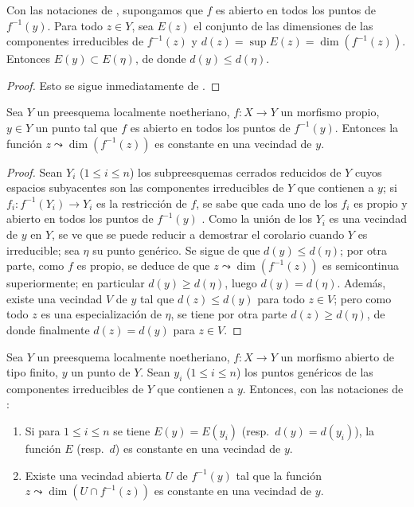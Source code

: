\begin{corollary}[14.2.4]
\label{IV.14.2.4}
Con las notaciones de , supongamos que $f$ es abierto en todos los puntos de $f^{-1}(y)$.
Para todo $z\in Y$, sea $E(z)$ el conjunto de las dimensiones de las componentes irreducibles de $f^{-1}(z)$ y $d(z)=\sup E(z)=\dim(f^{-1}(z))$.
Entonces $E(y)\subset E(\eta)$, de donde $d(y)\leq d(\eta)$.
\end{corollary}

\begin{proof}
Esto se sigue inmediatamente de .
\end{proof}

\begin{corollary}[14.2.5]
\label{IV.14.2.5}
Sea $Y$ un preesquema localmente noetheriano, $f:X\to Y$ un morfismo propio, $y\in Y$ un punto tal que $f$ es abierto en todos los puntos de $f^{-1}(y)$.
Entonces la función $z\leadsto\dim(f^{-1}(z))$ es constante en una vecindad de $y$.
\end{corollary}

\begin{proof}
Sean $Y_i$ ($1\leq i\leq n$) los subpreesquemas cerrados reducidos de $Y$ cuyos espacios subyacentes son las componentes irreducibles de $Y$ que contienen a $y$; si $f_i:f^{-1}(Y_i)\to Y_i$ es la restricción de $f$, se sabe que cada uno de los $f_i$ es propio  y abierto en todos los puntos de $f^{-1}(y)$ .
Como la unión de los $Y_i$ es una vecindad de $y$ en $Y$,
se ve que se puede reducir a demostrar el corolario cuando $Y$ es irreducible; sea $\eta$ su punto genérico.
Se sigue de  que $d(y)\leq d(\eta)$; por otra parte, como $f$ es propio, se deduce de  que $z\leadsto\dim(f^{-1}(z))$ es semicontinua superiormente; en particular $d(y)\geq d(\eta)$, luego $d(y)=d(\eta)$.
Además, existe una vecindad $V$ de $y$ tal que $d(z)\leq d(y)$ para todo $z\in V$; pero como todo $z$ es una especialización de $\eta$, se tiene por otra parte $d(z)\geq d(\eta)$, de donde finalmente $d(z)=d(y)$ para $z\in V$.
\end{proof}

\begin{corollary}[14.2.6]
\label{IV.14.2.6}
Sea $Y$ un preesquema localmente noetheriano, $f:X\to Y$ un morfismo abierto de tipo finito, $y$ un punto de $Y$.
Sean $y_i$ ($1\leq i\leq n$) los puntos genéricos de las componentes irreducibles de $Y$ que contienen a $y$.
Entonces, con las notaciones de :
\begin{enumerate}[label=(\roman*)]
  \item Si para $1\leq i\leq n$ se tiene $E(y)=E(y_i)$ \textup{(resp.\ $d(y)=d(y_i)$)}, la función $E$ \textup{(resp.\ $d$)} es constante en una vecindad de $y$.
  \item Existe una vecindad abierta $U$ de $f^{-1}(y)$ tal que la función $z\leadsto\dim(U\cap f^{-1}(z))$ es constante en una vecindad de $y$.
\end{enumerate}
\end{corollary}

